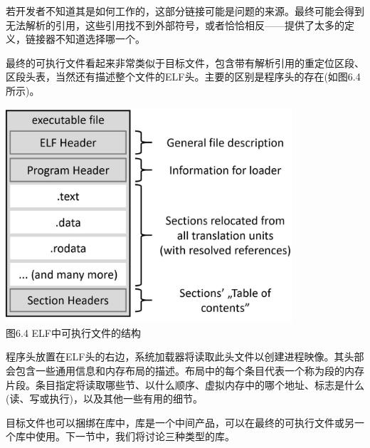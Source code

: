 若开发者不知道其是如何工作的，这部分链接可能是问题的来源。最终可能会得到无法解析的引用，这些引用找不到外部符号，或者恰恰相反——提供了太多的定义，链接器不知道选择哪一个。

最终的可执行文件看起来非常类似于目标文件，包含带有解析引用的重定位区段、区段头表，当然还有描述整个文件的ELF头。主要的区别是程序头的存在(如图6.4所示)。

\begin{center}
\includegraphics[width=0.8\textwidth]{content/2/chapter6/images/4.jpg}\\
图6.4  ELF中可执行文件的结构
\end{center}

程序头放置在ELF头的右边，系统加载器将读取此头文件以创建进程映像。其头部会包含一些通用信息和内存布局的描述。布局中的每个条目代表一个称为段的内存片段。条目指定将读取哪些节、以什么顺序、虚拟内存中的哪个地址、标志是什么(读、写或执行)，以及其他一些有用的细节。

目标文件也可以捆绑在库中，库是一个中间产品，可以在最终的可执行文件或另一个库中使用。下一节中，我们将讨论三种类型的库。




